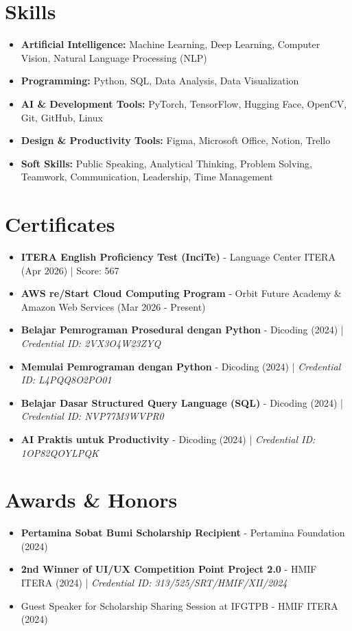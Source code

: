 \section*{Skills}
\begin{itemize}
  \item \textbf{Artificial Intelligence:} Machine Learning, Deep Learning, Computer Vision, Natural Language Processing (NLP)
  \item \textbf{Programming:} Python, SQL, Data Analysis, Data Visualization
  \item \textbf{AI \& Development Tools:} PyTorch, TensorFlow, Hugging Face, OpenCV, Git, GitHub, Linux
  \item \textbf{Design \& Productivity Tools:} Figma, Microsoft Office, Notion, Trello
  \item \textbf{Soft Skills:} Public Speaking, Analytical Thinking, Problem Solving, Teamwork, Communication, Leadership, Time Management
\end{itemize}

\section*{Certificates}
\begin{itemize}
  \item \textbf{ITERA English Proficiency Test (InciTe)} - Language Center ITERA (Apr 2026) | Score: 567
  \item \textbf{AWS re/Start Cloud Computing Program} - Orbit Future Academy \& Amazon Web Services (Mar 2026 - Present)
  \item \textbf{Belajar Pemrograman Prosedural dengan Python} - Dicoding (2024) | \textit{Credential ID: 2VX3O4W23ZYQ}
  \item \textbf{Memulai Pemrograman dengan Python} - Dicoding (2024) | \textit{Credential ID: L4PQQ8O2PO01}
  \item \textbf{Belajar Dasar Structured Query Language (SQL)} - Dicoding (2024) | \textit{Credential ID: NVP77M3WVPR0}
  \item \textbf{AI Praktis untuk Productivity} - Dicoding (2024) | \textit{Credential ID: 1OP82QOYLPQK}
\end{itemize}

\section*{Awards \& Honors}
\begin{itemize}
  \item \textbf{Pertamina Sobat Bumi Scholarship Recipient} - Pertamina Foundation (2024)
  \item \textbf{2nd Winner of UI/UX Competition Point Project 2.0} - HMIF ITERA (2024) | \textit{Credential ID: 313/525/SRT/HMIF/XII/2024}
  \item Guest Speaker for Scholarship Sharing Session at IFGTPB - HMIF ITERA (2024)
\end{itemize}

